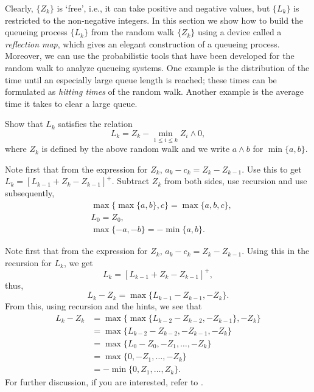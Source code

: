 Clearly, $\{Z_k\}$ is `free', i.e., it can take positive and negative
values, but $\{L_k\}$ is restricted to the non-negative integers.  In
this section we show how to build the queueing process $\{L_k\}$ from
the random walk $\{Z_k\}$ using a device called a \emph{reflection map}, which gives an  elegant construction of a queueing process. Moreover, we can use the probabilistic
tools that have been developed for the random walk to analyze queueing
systems. One example is the distribution of the time until an
especially large queue length is reached; these times can be
formulated as \emph{hitting times} of the random walk. Another example
is the average time it takes to clear a large queue.

\begin{exercise}[\faCalculator]
Show that  $L_k$ satisfies the relation
\begin{equation}\label{eq:reich1}
  L_k = Z_k - \min_{1\leq i \leq k} Z_i\wedge 0,
\end{equation}
where $Z_k$ is defined by the above random walk and
we write $a\wedge b$ for $\min\{a,b\}$.
\begin{hint}
Note first that from the expression for $Z_k$,
  $a_k - c_k = Z_k - Z_{k-1}$. Use this to get
  $L_k = [L_{k-1} +Z_k- Z_{k-1}]^+$. Subtract $Z_k$ from both sides, use recursion and
  use subsequently,
\begin{align*}
&\max\{\max\{a,b\}, c\} = \max\{a,b,c\}, \\
&L_0 = Z_0, \\
&\max\{-a, -b \} = -\min\{a,b\}.
\end{align*}
\end{hint}
\begin{solution}
Note first that from the expression
for $Z_k$, $a_k - c_k = Z_k - Z_{k-1}$. Using this in the recursion
for $L_k$, we get
\begin{equation*}
  L_k = [L_{k-1} +Z_k- Z_{k-1}]^+,
\end{equation*}
thus, 
\begin{equation*}
  L_k - Z_{k} = \max\{L_{k-1} - Z_{k-1}, -Z_k\}.
\end{equation*}
From this, using recursion and the hints, we see that
\begin{equation*}
  \begin{split}
  L_k - Z_{k} 
&= \max\{\max\{L_{k-2} - Z_{k-2}, -Z_{k-1}\}, -Z_k\} \\
&= \max\{L_{k-2} - Z_{k-2}, -Z_{k-1}, -Z_k\} \\
&= \max\{L_{0} - Z_{0}, -Z_1, \ldots, -Z_k\} \\
&= \max\{0, -Z_1, \ldots, -Z_k\} \\
&= - \min\{0, Z_1, \ldots, Z_k\}.
  \end{split}
  \end{equation*}
For further discussion, if you are interested, refer to
  \citet{baccelli88:_sampl_m_m}.
\end{solution}
\end{exercise}

